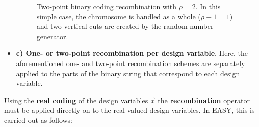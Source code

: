 \begin{itemize}
\begin{figure}[h!]
\begin{minipage}[b]{1.0\linewidth}
 \centering
\end{minipage}
\caption{Two-point binary coding recombination with $\rho=2$. In this simple case, the chromosome is handled as a whole ($\rho-1 = 1$) and two vertical cuts are created by the random number generator.} 
\label{2px}
\end{figure}

\item[]{\bf c) One- or two-point recombination per design variable}. Here, the aforementioned one- and two-point recombination schemes are separately applied to the parts  of the binary string that correspond to each design variable.  
\end{itemize}
  
Using the {\bf real coding} of the design variables $\vec{x}$ the {\bf recombination} operator must be applied directly on to the real-valued design variables. In EASY, this is carried out as follows:  

